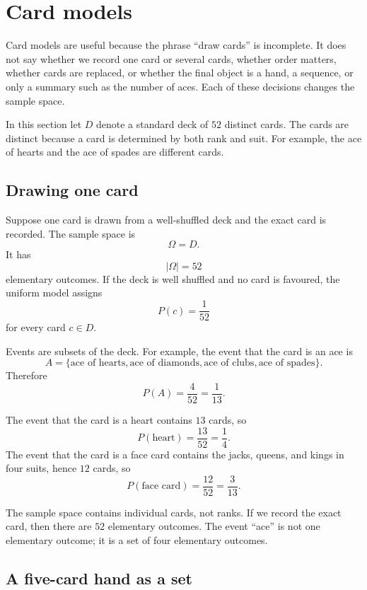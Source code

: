 \section{Card models}

Card models are useful because the phrase ``draw cards'' is incomplete. It does
not say whether we record one card or several cards, whether order matters,
whether cards are replaced, or whether the final object is a hand, a sequence,
or only a summary such as the number of aces. Each of these decisions changes
the sample space.

In this section let \(D\) denote a standard deck of \(52\) distinct cards. The
cards are distinct because a card is determined by both rank and suit. For
example, the ace of hearts and the ace of spades are different cards.

\subsection*{Drawing one card}

Suppose one card is drawn from a well-shuffled deck and the exact card is
recorded. The sample space is
\[
\Omega=D.
\]
It has
\[
|\Omega|=52
\]
elementary outcomes. If the deck is well shuffled and no card is favoured, the
uniform model assigns
\[
P(c)=\frac1{52}
\]
for every card \(c\in D\).

Events are subsets of the deck. For example, the event that the card is an ace
is
\[
A=\{\text{ace of hearts},\text{ace of diamonds},\text{ace of clubs},
\text{ace of spades}\}.
\]
Therefore
\[
P(A)=\frac4{52}=\frac1{13}.
\]

The event that the card is a heart contains \(13\) cards, so
\[
P(\text{heart})=\frac{13}{52}=\frac14.
\]
The event that the card is a face card contains the jacks, queens, and kings in
four suits, hence \(12\) cards, so
\[
P(\text{face card})=\frac{12}{52}=\frac3{13}.
\]

\begin{remarkbox}
The sample space contains individual cards, not ranks. If we record the exact
card, then there are \(52\) elementary outcomes. The event ``ace'' is not one
elementary outcome; it is a set of four elementary outcomes.
\end{remarkbox}

\subsection*{A five-card hand as a set}


